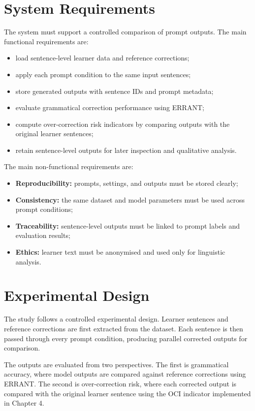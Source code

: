 \section{System Requirements}

The system must support a controlled comparison of prompt outputs. The main functional requirements are:

\begin{itemize}
    \item load sentence-level learner data and reference corrections;
    \item apply each prompt condition to the same input sentences;
    \item store generated outputs with sentence IDs and prompt metadata;
    \item evaluate grammatical correction performance using ERRANT;
    \item compute over-correction risk indicators by comparing outputs with the original learner sentences;
    \item retain sentence-level outputs for later inspection and qualitative analysis.
\end{itemize}

The main non-functional requirements are:

\begin{itemize}
    \item \textbf{Reproducibility:} prompts, settings, and outputs must be stored clearly;
    \item \textbf{Consistency:} the same dataset and model parameters must be used across prompt conditions;
    \item \textbf{Traceability:} sentence-level outputs must be linked to prompt labels and evaluation results;
    \item \textbf{Ethics:} learner text must be anonymised and used only for linguistic analysis.
\end{itemize}

\section{Experimental Design}

The study follows a controlled experimental design. Learner sentences and reference corrections are first extracted from the dataset. Each sentence is then passed through every prompt condition, producing parallel corrected outputs for comparison.

The outputs are evaluated from two perspectives. The first is grammatical accuracy, where model outputs are compared against reference corrections using ERRANT. The second is over-correction risk, where each corrected output is compared with the original learner sentence using the OCI indicator implemented in Chapter 4.

